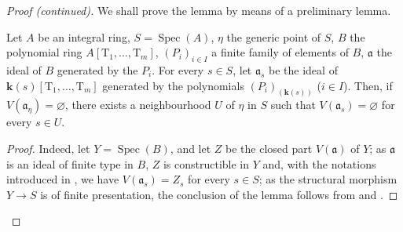 \begin{proof}[Proof (continued)]
We shall prove the lemma by means of a preliminary lemma.

\begin{lemma}[9.7.5.1]
\label{IV.9.7.5.1}
Let $A$ be an integral ring, $S=\operatorname{Spec}(A)$, $\eta$ the generic point of $S$, $B$ the polynomial ring $A[\mathrm{T}_1,\ldots,\mathrm{T}_m]$, $(P_i)_{i\in I}$ a finite family of elements of $B$, $\mathfrak{a}$ the ideal of $B$ generated by the $P_i$.
For every $s\in S$, let $\mathfrak{a}_s$ be the ideal of $\boldsymbol{k}(s)[\mathrm{T}_1,\ldots,\mathrm{T}_m]$ generated by the polynomials $(P_i)_{(\boldsymbol{k}(s))}$ ($i\in I$).
Then, if $V(\mathfrak{a}_\eta)=\varnothing$, there exists a neighbourhood $U$ of $\eta$ in $S$ such that $V(\mathfrak{a}_s)=\varnothing$ for every $s\in U$.
\end{lemma}

\begin{proof}
Indeed, let $Y=\operatorname{Spec}(B)$, and let $Z$ be the closed part $V(\mathfrak{a})$ of $Y$; as $\mathfrak{a}$ is an ideal of finite type in $B$, $Z$ is constructible in $Y$  and, with the notations introduced in , we have $V(\mathfrak{a}_s)=Z_s$ for every $s\in S$; as the structural morphism $Y\to S$ is of finite presentation, the conclusion of the lemma follows from  and .
\end{proof}


\end{proof}
